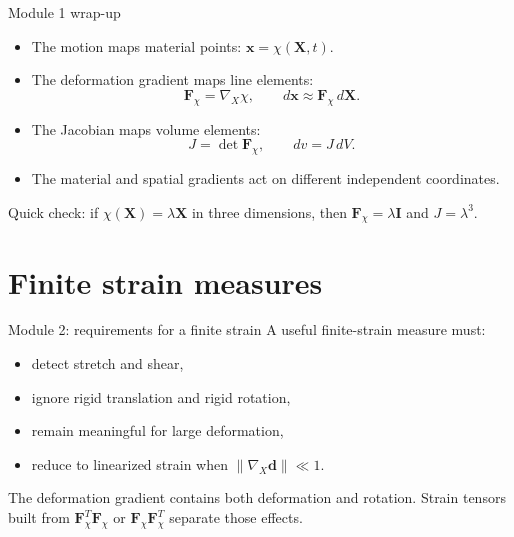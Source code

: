 \documentclass[aspectratio=169,11pt]{beamer}
\newcommand{\X}{\bm{X}}
\newcommand{\x}{\bm{x}}
\newcommand{\I}{\bm{I}}
\newcommand{\Fdef}{\bm{F}_{\chi}}
\newcommand{\gradX}{\nabla_{\!X}}
\begin{document}
\begin{frame}{Module 1 wrap-up}
\begin{itemize}\itemsep6pt
  \item The motion maps material points: \(\x=\chi(\X,t)\).
  \item The deformation gradient maps line elements:
  \[
    \Fdef=\gradX\chi,\qquad d\x\approx\Fdef\,d\X.
  \]
  \item The Jacobian maps volume elements:
  \[
    J=\det\Fdef,\qquad dv=J\,dV.
  \]
  \item The material and spatial gradients act on different independent coordinates.
\end{itemize}
\medskip
\begin{punchbox}
\small
Quick check: if \(\chi(\X)=\lambda\X\) in three dimensions, then \(\Fdef=\lambda\I\) and \(J=\lambda^3\).
\end{punchbox}
\end{frame}

\section{Finite strain measures}

\begin{frame}{Module 2: requirements for a finite strain}
A useful finite-strain measure must:
\begin{itemize}\itemsep7pt
  \item detect stretch and shear,
  \item ignore rigid translation and rigid rotation,
  \item remain meaningful for large deformation,
  \item reduce to linearized strain when
  \(\lVert\gradX\bm{d}\rVert\ll1\).
\end{itemize}
\medskip
\begin{punchbox}
\small
The deformation gradient contains both deformation and rotation. Strain tensors built from \(\Fdef^T\Fdef\) or \(\Fdef\Fdef^T\) separate those effects.
\end{punchbox}
\end{frame}
\end{document}
